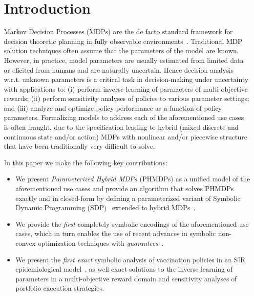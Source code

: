 \section{Introduction}
\label{sec:introduction}

Markov Decision Processes (MDPs) are the de facto standard framework for decision theoretic planning in fully observable environments~\cite{Boutilier_JAIR_1999}. Traditional MDP solution techniques often assume that the parameters of the model are known. However, in practice, model parameters are usually estimated from limited data or elicited from humans and are naturally uncertain. Hence decision analysis w.r.t. unknown parameters is a critical task in decision-making under uncertainty with applications to: (i) perform inverse learning of parameters of multi-objective rewards; (ii) perform sensitivity analyses of policies to various parameter settings; and (iii) analyze and optimize policy performance as a function of policy parameters. Formalizing models to address each of the aforementioned use cases is often fraught, due to the specification leading to hybrid (mixed discrete and continuous state and/or action) MDPs with nonlinear and/or piecewise structure that have been traditionally very difficult to solve.

In this paper we make the following key contributions:
\begin{itemize}
\item We present {\it Parameterized Hybrid MDPs} (PHMDPs) as a unified model of the aforementioned use cases and provide an algorithm that solves PHMDPs exactly and in closed-form by defining a parameterized variant of Symbolic Dynamic Programming (SDP)~\cite{Boutilier_IJCAI_2001} extended to hybrid MDPs~\cite{Sanner_UAI_2011}. 
\item We provide the \textit{first} completely symbolic encodings of the aforementioned use cases, which in turn enables the use of recent advances in symbolic non-convex optimization techniques with \textit{guarantees}~\cite{Gao2013}.
\item We present the \textit{first exact} symbolic analysis of vaccination policies in an SIR epidemiological model~\cite{KermackMcKendrick_1927}, as well exact solutions to the inverse learning of parameters in a multi-objective reward domain and sensitivity analyses of portfolio execution strategies.
\end{itemize}